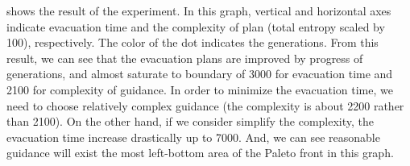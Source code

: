  shows the result
of the experiment.
In this graph, vertical and horizontal axes indicate
evacuation time and the complexity of plan (total entropy
scaled by 100), respectively.
The color of the dot indicates the generations.
From this result,
we can see that the evacuation plans are improved by progress
of generations, and almost saturate to boundary of 3000 for
evacuation time and 2100 for complexity of guidance.
In order to minimize the evacuation time,
we need to choose relatively complex guidance (the complexity is about 2200
rather than 2100).
On the other hand, if we consider simplify the complexity,
the evacuation time increase drastically up to 7000.
And, we can see reasonable guidance will exist the most left-bottom
area of the Paleto front in this graph.


